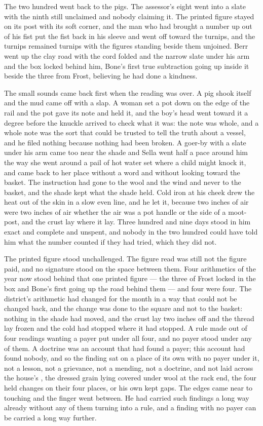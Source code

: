 The two hundred went back to the pigs. The assessor's eight went into a slate with the ninth still unclaimed and nobody claiming it. The printed figure stayed on its post with its soft corner, and the man who had brought a number up out of his fist put the fist back in his sleeve and went off toward the turnips, and the turnips remained turnips with the figures standing beside them unjoined. Berr went up the clay road with the cord folded and the narrow slate under his arm and the box locked behind him, Bone's first true subtraction going up inside it beside the three from Frost, believing he had done a kindness.

\scenebreak

The small sounds came back first when the reading was over. A pig shook itself and the mud came off with a slap. A woman set a pot down on the edge of the rail and the pot gave its note and held it, and the boy's head went toward it a degree before the knuckle arrived to check what it was: the note was whole, and a whole note was the sort that could be trusted to tell the truth about a vessel, and he filed nothing because nothing had been broken. A goer-by with a slate under his arm came too near the shade and Sella went half a pace around him the way she went around a pail of hot water set where a child might knock it, and came back to her place without a word and without looking toward the basket. The instruction had gone to the wool and the wind and never to the basket, and the shade kept what the shade held. Cold iron at his cheek drew the heat out of the skin in a slow even line, and he let it, because two inches of air were two inches of air whether the air was a pot handle or the side of a moot-post, and the crust lay where it lay. Three hundred and nine days stood in him exact and complete and unspent, and nobody in the two hundred could have told him what the number counted if they had tried, which they did not.

The printed figure stood unchallenged. The figure read was still not the figure paid, and no signature stood on the space between them. Four arithmetics of the year now stood behind that one printed figure --- the three of Frost locked in the box and Bone's first going up the road behind them --- and four were four. The district's arithmetic had changed for the month in a way that could not be changed back, and the change was done to the square and not to the basket: nothing in the shade had moved, and the crust lay two inches off and the thread lay frozen and the cold had stopped where it had stopped. A rule made out of four readings wanting a payer put under all four, and no payer stood under any of them. A doctrine was an account that had found a payer; this account had found nobody, and so the finding sat on a place of its own with no payer under it, not a lesson, not a grievance, not a mending, not a doctrine, and not laid across the house's , the dressed grain lying covered under wool at the rack end, the four held changes on their four places, or his own kept gaps. The edges came near to touching and the finger went between. He had carried such findings a long way already without any of them turning into a rule, and a finding with no payer can be carried a long way further.

